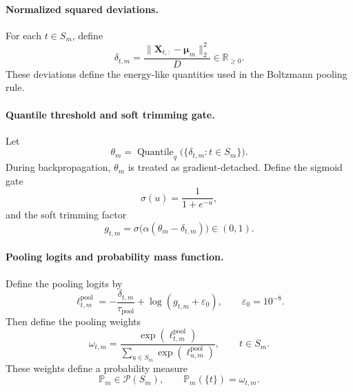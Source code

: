 \documentclass{article}
\theoremstyle{plain}
\theoremstyle{definition}
\theoremstyle{remark}
\begin{document}
\paragraph{Normalized squared deviations.}
For each $t\in S_m$, define
\begin{equation}
\label{eq:normalized-deviation}
\delta_{t,m}=\frac{\|\mathbf X_{t,:}-\boldsymbol\mu_m\|_2^2}{D}\in\mathbb R_{\ge 0}.
\end{equation}
These deviations define the energy-like quantities used in the Boltzmann pooling rule.

\paragraph{Quantile threshold and soft trimming gate.}
Let
\begin{equation}
\label{eq:trimming-threshold}
\theta_m=\operatorname{Quantile}_q\bigl(\{\delta_{t,m}:t\in S_m\}\bigr).
\end{equation}
During backpropagation, $\theta_m$ is treated as gradient-detached. Define the sigmoid gate
\begin{equation}
\label{eq:sigmoid}
\sigma(u)=\frac{1}{1+e^{-u}},
\end{equation}
and the soft trimming factor
\begin{equation}
\label{eq:trimming-gate}
g_{t,m}=\sigma\bigl(\alpha(\theta_m-\delta_{t,m})\bigr)\in(0,1).
\end{equation}

\paragraph{Pooling logits and probability mass function.}
Define the pooling logits by
\begin{equation}
\label{eq:pooling-logits}
\ell^{\mathrm{pool}}_{t,m}=-\frac{\delta_{t,m}}{\tau_{\mathrm{pool}}}+\log(g_{t,m}+\varepsilon_0),
\qquad
\varepsilon_0=10^{-8}.
\end{equation}
Then define the pooling weights
\begin{equation}
\label{eq:pooling-weights}
\omega_{t,m}=\frac{\exp(\ell^{\mathrm{pool}}_{t,m})}{\sum_{u\in S_m}\exp(\ell^{\mathrm{pool}}_{u,m})},
\qquad t\in S_m.
\end{equation}
These weights define a probability measure
\begin{equation}
\label{eq:pooling-pmf}
\mathbb P_m\in\mathcal P(S_m),
\qquad
\mathbb P_m(\{t\})=\omega_{t,m}.
\end{equation}
\end{document}
